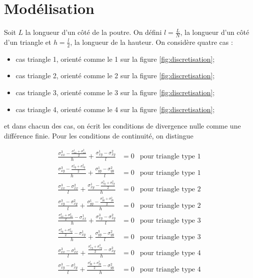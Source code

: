 \newpage
\section{Modélisation}
Soit $L$ la longueur d'un côté de la poutre. On défini $l=\frac{L}{N}$, la longueur d'un côté d'un triangle et $h=\frac{l}{2}$, la longueur de la hauteur. On considère quatre cas : 
\begin{itemize}
\item cas triangle 1, orienté comme le 1 sur la figure \ref{fig:discretisation};
\item cas triangle 2, orienté comme le 2 sur la figure \ref{fig:discretisation};
\item cas triangle 3, orienté comme le 3 sur la figure \ref{fig:discretisation};
\item cas triangle 4, orienté comme le 4 sur la figure \ref{fig:discretisation};
\end{itemize} 
et dans chacun des cas, on écrit les conditions de divergence nulle comme une différence finie. Pour les conditions de continuité, on distingue 

\begin{align*}
\frac{\sigma_{xx}^3 - \frac{\sigma_{xx}^1+\sigma_{xx}^2}{2}}{h} + \frac{\sigma_{xy}^1-\sigma_{xy}^2}{l}&=0 & \text{pour triangle type 1}\\
\frac{\sigma_{xy}^3 - \frac{\sigma_{xy}^1+\sigma_{xy}^2}{2}}{h} + \frac{\sigma_{yy}^1-\sigma_{yy}^2}{l}&=0& \text{pour triangle type 1}\\
\frac{\sigma_{xx}^3-\sigma_{xx}^2}{l} + \frac{\sigma_{xy}^1 - \frac{\sigma_{xy}^3+\sigma_{xy}^2}{2}}{h} &=0& \text{pour triangle type 2}\\
\frac{\sigma_{xy}^3-\sigma_{xy}^2}{l} + \frac{\sigma_{yy}^1 - \frac{\sigma_{yy}^3+\sigma_{yy}^2}{2}}{h} &=0 & \text{pour triangle type 2}\\
\frac{\frac{\sigma_{xx}^3+\sigma_{xx}^2}{2} - \sigma_{xx}^1 }{h} + \frac{\sigma_{xy}^3-\sigma_{xy}^2}{l}&=0& \text{pour triangle type 3}\\
\frac{\frac{\sigma_{xy}^3+\sigma_{xy}^2}{2} - \sigma_{xy}^1 }{h} + \frac{\sigma_{yy}^3-\sigma_{yy}^2}{l}&=0& \text{pour triangle type 3}\\
\frac{\sigma_{xx}^3-\sigma_{xx}^1}{l} + \frac{\frac{\sigma_{xy}^1+\sigma_{xy}^3}{2} - \sigma_{xy}^2 }{h} &=0 & \text{pour triangle type 4}\\
\frac{\sigma_{xy}^3-\sigma_{xy}^1}{l} + \frac{\frac{\sigma_{yy}^1+\sigma_{yy}^3}{2} - \sigma_{yy}^2 }{h} &=0 & \text{pour triangle type 4}\\
\end{align*}



